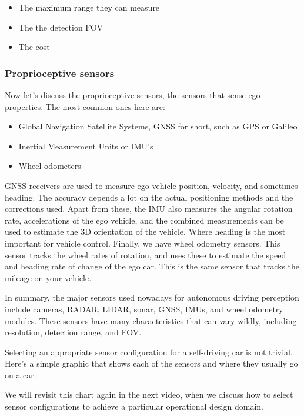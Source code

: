 \begin{itemize}
\item The maximum range they can measure
\item The the detection FOV
\item The cost
\end{itemize}

\subsubsection{Proprioceptive sensors}

Now let's discuss the proprioceptive sensors, the sensors that sense ego properties. The most common ones here
are:

\begin{itemize}
\item Global Navigation Satellite Systems, GNSS for short, such as GPS or Galileo
\item Inertial Measurement Units or IMU's
\item Wheel odometers
\end{itemize}

GNSS receivers are used to measure ego vehicle position, velocity, and sometimes heading. The accuracy depends a lot on
the actual positioning methods and the corrections used. Apart from these, the IMU also
measures the angular rotation rate, accelerations of the ego vehicle, and
the combined measurements can be used to estimate the 3D orientation
of the vehicle. Where heading is the most important for
vehicle control. Finally, we have wheel odometry sensors. This sensor tracks the wheel
rates of rotation, and uses these to estimate the speed and
heading rate of change of the ego car. This is the same sensor that tracks
the mileage on your vehicle. 



In summary, the major sensors used nowadays for autonomous driving perception
include cameras, RADAR, LIDAR, sonar, GNSS, IMUs,
and wheel odometry modules. These sensors have many
characteristics that can vary wildly, including resolution,
detection range, and FOV. 

Selecting an appropriate sensor configuration for a self-driving car is not trivial. Here's a simple graphic that
shows each of the sensors and where they usually go on a car. 


We will revisit this chart again in the
next video, when we discuss how to select sensor configurations to achieve
a particular operational design domain. 


